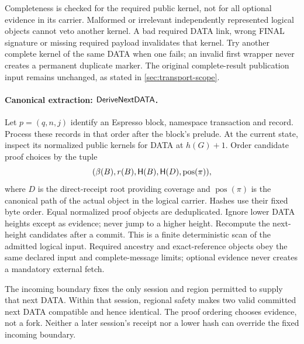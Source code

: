 Completeness is checked for the required public kernel, not for all
optional evidence in its carrier. Malformed or irrelevant independently
represented logical objects cannot veto another kernel. A bad required DATA link,
wrong FINAL signature or missing required payload invalidates that
kernel. Try another complete kernel of the same DATA when one fails;
an invalid first wrapper never creates a permanent duplicate marker.
The original complete-result publication input remains unchanged, as
stated in \cref{sec:transport-scope}.

\paragraph{Canonical extraction: $\mathsf{DeriveNextDATA}$.}
Let $p=(q,n,j)$ identify an Espresso block, namespace transaction and
record. Process these records in that order after the block's prelude.
At the current state, inspect its normalized public kernels for DATA at
$h(G)+1$. Order candidate proof choices by the tuple
\[
 (\beta(B),r(B),\mathsf H(B),\mathsf H(D),\operatorname{pos}(\pi)),
\]
where $D$ is the direct-receipt root providing coverage and
$\operatorname{pos}(\pi)$ is the canonical path of the actual object in the logical carrier.
Hashes use their fixed byte order. Equal normalized proof objects are
deduplicated. Ignore lower DATA heights except as evidence; never jump
to a higher height. Recompute the next-height candidates after a commit.
This is a finite deterministic scan of the admitted logical input.
Required ancestry and exact-reference objects obey the same declared
input and complete-message limits; optional evidence never creates a
mandatory external fetch.

The incoming boundary fixes the only session and region permitted to
supply that next DATA. Within that session, regional safety makes two
valid committed next DATA compatible and hence identical. The proof
ordering chooses evidence, not a fork. Neither a later session's
receipt nor a lower hash can override the fixed incoming boundary.

